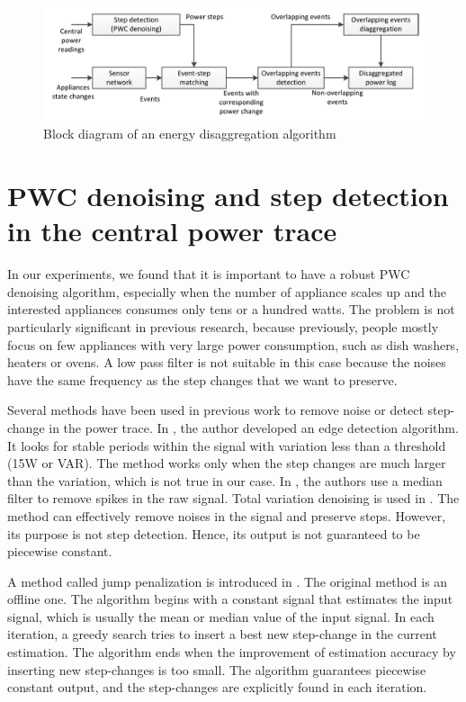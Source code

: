 \begin{figure}[htb]
  \centering
  \includegraphics[width=\textwidth]{figures/algooverview}
  \caption{Block diagram of an energy disaggregation algorithm}
  \label{fig:algooverview}
\end{figure}

\section{PWC denoising and step detection in the central power trace}

In our experiments, we found that it is important to have a robust PWC denoising algorithm, especially when the number of appliance scales up and the interested appliances consumes only tens or a hundred watts. The problem is not particularly significant in previous research, because previously, people mostly focus on few appliances with very large power consumption, such as dish washers, heaters or ovens. A low pass filter is not suitable in this case because the noises have the same frequency as the step changes that we want to preserve. 

Several methods have been used in previous work to remove noise or detect step-change in the power trace. In \cite{Hart1992}, the author developed an edge detection algorithm. It looks for stable periods within the signal with variation less than a threshold (15W or VAR). The method works only when the step changes are much larger than the variation, which is not true in our case. In \cite{Norford1996}, the authors use a median filter to remove spikes in the raw signal. Total variation denoising is used in \cite{Kolter2012}. The method can effectively remove noises in the signal and preserve steps. However, its purpose is not step detection. Hence, its output is not guaranteed to be piecewise constant. 

A method called jump penalization is introduced in \cite{Little2011}. The original method is an offline one. The algorithm begins with a constant signal that estimates the input signal, which is usually the mean or median value of the input signal. In each iteration, a greedy search tries to insert a best new step-change in the current estimation. The algorithm ends when the improvement of estimation accuracy by inserting new step-changes is too small. The algorithm guarantees piecewise constant output, and the step-changes are explicitly found in each iteration. 

